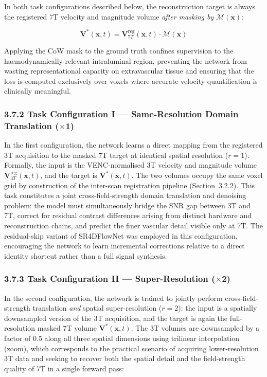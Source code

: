 \documentclass[11pt]{article}
\begin{document}
In both task configurations described below, the reconstruction target is always the registered 7T velocity and magnitude volume \emph{after masking by} $\mathcal{M}(\mathbf{x})$:

\begin{equation}
    \mathbf{V}^{*}(\mathbf{x}, t) = \mathbf{V}_{7T}^{\text{reg}}(\mathbf{x}, t) \cdot \mathcal{M}(\mathbf{x})
\end{equation}

Applying the CoW mask to the ground truth confines supervision to the haemodynamically relevant intraluminal region, preventing the network from wasting representational capacity on extravascular tissue and ensuring that the loss is computed exclusively over voxels where accurate velocity quantification is clinically meaningful.

\subsubsection*{3.7.2 Task Configuration I --- Same-Resolution Domain Translation ($\times$1)}

In the first configuration, the network learns a direct mapping from the registered 3T acquisition to the masked 7T target at identical spatial resolution ($r = 1$). Formally, the input is the VENC-normalised 3T velocity and magnitude volume $\mathbf{V}_{3T}^{\text{reg}}(\mathbf{x}, t)$, and the target is $\mathbf{V}^{*}(\mathbf{x}, t)$. The two volumes occupy the same voxel grid by construction of the inter-scan registration pipeline (Section~3.2.2). This task constitutes a joint cross-field-strength domain translation and denoising problem: the model must simultaneously bridge the SNR gap between 3T and 7T, correct for residual contrast differences arising from distinct hardware and reconstruction chains, and predict the finer vascular detail visible only at 7T. The residual-skip variant of SR4DFlowNet was employed in this configuration, encouraging the network to learn incremental corrections relative to a direct identity shortcut rather than a full signal synthesis.

\subsubsection*{3.7.3 Task Configuration II --- Super-Resolution ($\times$2)}

In the second configuration, the network is trained to jointly perform cross-field-strength translation \emph{and} spatial super-resolution ($r = 2$): the input is a spatially downsampled version of the 3T acquisition, and the target is again the full-resolution masked 7T volume $\mathbf{V}^{*}(\mathbf{x}, t)$. The 3T volumes are downsampled by a factor of 0.5 along all three spatial dimensions using trilinear interpolation (zoom), which corresponds to the practical scenario of acquiring lower-resolution 3T data and seeking to recover both the spatial detail and the field-strength quality of 7T in a single forward pass:
\end{document}
